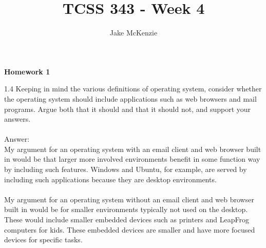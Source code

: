 \documentclass[12pt]{article}
\begin{document}
\title{TCSS 343 - Week 4}
\author{Jake McKenzie}
\maketitle
\noindent\centerline{\textbf{Homework 1}}
1.4 Keeping in mind the various definitions of operating system, consider
whether the operating system should include applications such as web
browsers and mail programs. Argue both that it should and that it
should not, and support your answers.\\\\

Answer: \\

My argument for an operating system with an email client and web browser built in 
would be that larger more involved environments benefit in some function 
way by including such features. Windows and Ubuntu, for example, are served by 
including such applications because they are desktop environments.  \\\\

My argument for an operating system without an email client 
and web browser built in would be for smaller environments 
typically not used on the desktop. These would include smaller 
embedded devices such as printers and LeapFrog computers for kids. 
These embedded devices are smaller and have more focused devices 
for specific tasks.\\\\
\end{document}
